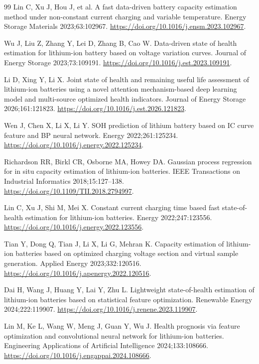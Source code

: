 \begin{thebibliography}{99}
 Lin C, Xu J, Hou J, et al. A fast data-driven battery capacity estimation method under non-constant current charging and variable temperature. Energy Storage Materials 2023;63:102967. \url{https://doi.org/10.1016/j.ensm.2023.102967}.

 Wu J, Liu Z, Zhang Y, Lei D, Zhang B, Cao W. Data-driven state of health estimation for lithium-ion battery based on voltage variation curves. Journal of Energy Storage 2023;73:109191. \url{https://doi.org/10.1016/j.est.2023.109191}.

 Li D, Xing Y, Li X. Joint state of health and remaining useful life assessment of lithium-ion batteries using a novel attention mechanism-based deep learning model and multi-source optimized health indicators. Journal of Energy Storage 2026;161:121823. \url{https://doi.org/10.1016/j.est.2026.121823}.

 Wen J, Chen X, Li X, Li Y. SOH prediction of lithium battery based on IC curve feature and BP neural network. Energy 2022;261:125234. \url{https://doi.org/10.1016/j.energy.2022.125234}.

 Richardson RR, Birkl CR, Osborne MA, Howey DA. Gaussian process regression for in situ capacity estimation of lithium-ion batteries. IEEE Transactions on Industrial Informatics 2018;15:127–138. \url{https://doi.org/10.1109/TII.2018.2794997}.

 Lin C, Xu J, Shi M, Mei X. Constant current charging time based fast state-of-health estimation for lithium-ion batteries. Energy 2022;247:123556. \url{https://doi.org/10.1016/j.energy.2022.123556}.

 Tian Y, Dong Q, Tian J, Li X, Li G, Mehran K. Capacity estimation of lithium-ion batteries based on optimized charging voltage section and virtual sample generation. Applied Energy 2023;332:120516. \url{https://doi.org/10.1016/j.apenergy.2022.120516}.

 Dai H, Wang J, Huang Y, Lai Y, Zhu L. Lightweight state-of-health estimation of lithium-ion batteries based on statistical feature optimization. Renewable Energy 2024;222:119907. \url{https://doi.org/10.1016/j.renene.2023.119907}.

 Lin M, Ke L, Wang W, Meng J, Guan Y, Wu J. Health prognosis via feature optimization and convolutional neural network for lithium-ion batteries. Engineering Applications of Artificial Intelligence 2024;133:108666. \url{https://doi.org/10.1016/j.engappai.2024.108666}.


\end{thebibliography}
